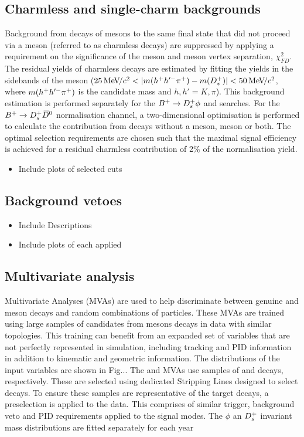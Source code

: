 \subsection{Charmless and single-charm backgrounds}
Background from decays of \Bp mesons to the same final state that did not proceed via a \Dsp meson (referred to as charmless decays) are suppressed by applying a requirement on the significance of the \Bp meson and \Dsp meson vertex separation, $\chi^{2}_{FD}$. 
The residual yields of charmless decays are estimated by fitting the \Bp yields in the sidebands of the \Dsp meson ($25{\mathrm{\,Me\kern -0.1em V\!/}c^2} < |m(h^{+}h'^{-}{{\pi}^+}) - m({{D}^+_{s}})| < 50{\mathrm{\,Me\kern -0.1em V\!/}c^2} $, where $m(h^{+}h'^{-}{{\pi}^+})$ is the \Dsp candidate mass and $h,h'=K,\pi$). This background estimation is performed separately for the ${{{B}^+}} \rightarrow {\ensuremath{{D}^+_{s}}} \phi$ and \decay{\Bp}{\Dsp\Kp\Km} searches. For the ${{{B}^+}} \rightarrow {\ensuremath{{D}^+_{s}}} {\ensuremath{{\kern 0.2em\overline{\kern -0.2em D}{}}{}^0}}$ normalisation channel, a two-dimensional optimisation is performed to calculate the contribution from decays without a \Dsp meson, \Dzb meson or both. The optimal selection requirements are chosen such that the maximal signal efficiency is achieved for a residual charmless contribution of 2\% of the normalisation yield.

\begin{itemize}
\item Include plots of selected cuts
\end{itemize}

\subsection{Background vetoes}

\begin{itemize}
\item Include Descriptions
\item Include plots of each applied
\end{itemize}

\subsection{Multivariate analysis}

Multivariate Analyses (MVAs) are used to help discriminate between genuine \Dsp and \phiz meson decays and random combinations of particles. 
These MVAs are trained using large samples of candidates from \B mesons decays in data with similar topologies. 
This training can benefit from an expanded set of variables that are not perfectly represented in simulation, including tracking and PID information in addition to kinematic and geometric information. The distributions of the input variables are shown in Fig... The \phiz and \Dsp MVAs use samples of \decay{\Bs}{\jpsi\phiz} and \decay{\Bsb}{\Dsp\pim} decays, respectively. These are selected using dedicated Stripping Lines designed to select decays. To ensure these samples are representative of the target decays, a preselection is applied to the data. This comprises of similar trigger, background veto and PID requirements applied to the signal modes.
The $\phi$ an ${{D}^+_{s}}$ invariant mass distributions are fitted separately for each year 

